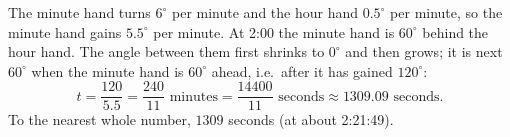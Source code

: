 The minute hand turns $6^\circ$ per minute and the hour hand $0.5^\circ$ per minute, so the minute hand gains $5.5^\circ$ per minute. At 2:00 the minute hand is $60^\circ$ behind the hour hand. The angle between them first shrinks to $0^\circ$ and then grows; it is next $60^\circ$ when the minute hand is $60^\circ$ ahead, i.e.\ after it has gained $120^\circ$:
\[
t=\dfrac{120}{5.5}=\dfrac{240}{11}\text{ minutes}=\dfrac{14400}{11}\text{ seconds}\approx1309.09\text{ seconds}.
\]
To the nearest whole number, $\boxed{1309}$ seconds (at about 2:21:49).
